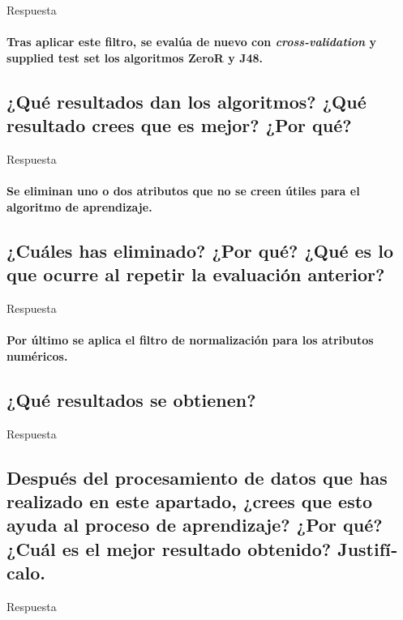 \documentclass[12pt]{article}
\begin{document}
Respuesta

\paragraph{\small Tras aplicar este filtro, se evalúa de nuevo con \emph{cross-validation}
 y supplied test set los algoritmos ZeroR y J48.}

\subsection{\small ¿Qué resultados dan los algoritmos? ¿Qué resultado crees que es
mejor? ¿Por qué?}

Respuesta

\paragraph{\small Se eliminan uno o dos atributos que no se creen útiles para el
algoritmo de aprendizaje.}
\subsection{\small ¿Cuáles has eliminado? ¿Por qué? ¿Qué es lo que ocurre al repetir la evaluación anterior?}

Respuesta

\paragraph{\small Por último se aplica el filtro de normalización para los atributos
numéricos.}

\subsection{\small ¿Qué resultados se obtienen?}

Respuesta

\subsection{\small Después del procesamiento de datos que has realizado en este
apartado, ¿crees que esto ayuda al proceso de aprendizaje? ¿Por qué? ¿Cuál es
el mejor resultado obtenido? Justifí­calo.}

Respuesta
\end{document}
